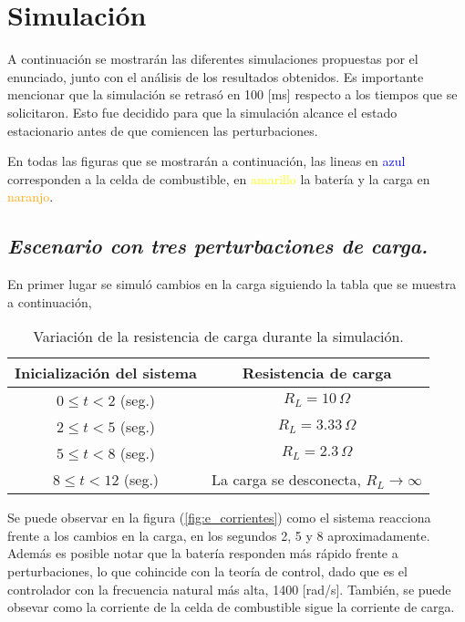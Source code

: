 \section{Simulación}
A continuación se mostrarán las diferentes simulaciones propuestas por el enunciado, junto con el análisis de los resultados obtenidos. Es importante mencionar que la simulación se retrasó en 100 [ms] respecto a los tiempos que se solicitaron. Esto fue decidido para que la simulación alcance el estado estacionario antes de que comiencen las perturbaciones.

En todas las figuras que se mostrarán a continuación, las lineas en \textcolor{blue}{azul}
corresponden a la celda de combustible, en \textcolor{yellow}{amarillo} la
batería y la carga en \textcolor{orange}{naranjo}.

\subsection{\textit{Escenario con tres perturbaciones de carga.}}

En primer lugar se simuló cambios en la carga siguiendo la tabla que se 
muestra a continuación, 

\begin{table}[H]
\centering
\begin{tabular}{|c|c|}
\hline
\textbf{Inicialización del sistema} & \textbf{Resistencia de carga} \\
\hline
$0 \leq t < 2$ (seg.) & $R_L = 10\,\Omega$ \\
\hline
$2 \leq t < 5$ (seg.) & $R_L = 3.33\,\Omega$ \\
\hline
$5 \leq t < 8$ (seg.) & $R_L = 2.3\,\Omega$ \\
\hline
$8 \leq t < 12$ (seg.) & La carga se desconecta, $R_L \rightarrow \infty$ \\
\hline
\end{tabular}
\caption{Variación de la resistencia de carga durante la simulación.}
\label{tab:e}
\end{table}

Se puede observar en la figura (\ref{fig:e_corrientes}) como el sistema reacciona
frente a los cambios en la carga, en los segundos 2, 5 y 8 aproximadamente.
Además es posible notar que la batería responden más rápido frente a perturbaciones,
lo que cohincide con la teoría de control, dado que es el controlador con la
frecuencia natural más alta, 1400 [rad/s]. También, se puede obsevar como la corriente de la celda de combustible
sigue la corriente de carga. 

